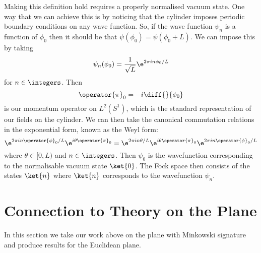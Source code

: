 \documentclass[fleqn]{NotesClass}
\begin{document}
    Making this definition hold requires a properly normalised vacuum state.
    One way that we can achieve this is by noticing that the cylinder imposes periodic boundary conditions on any wave function.
    So, if the wave function \(\psi_n\) is a function of \(\phi_0\) then it should be that \(\psi(\phi_0) = \psi(\phi_0 + L)\).
    We can impose this by taking
    \begin{equation}
        \psi_n(\phi_0) = \frac{1}{\sqrt{L}} \e^{2\pi i n\phi_0/L}
    \end{equation}
    for \(n \in \integers\).
    Then
    \begin{equation}
        \operator{\pi}_0 = -i\diff{}{\phi_0}
    \end{equation}
    is our momentum operator on \(L^2(S^1)\), which is the standard representation of our fields on the cylinder.
    We can then take the canonical commutation relations in the exponential form, known as the Weyl form:
    \begin{equation}
        \e^{2\pi in\operator{\phi}_0/L} \e^{i\theta \operator{\pi}_0} = \e^{2\pi in \theta/L} \e^{i\theta\operator{\pi}_0} \e^{2\pi in \operator{\phi}_0/L}
    \end{equation}
    where \(\theta \in [0, L)\) and \(n \in \integers\).
    Then \(\psi_0\) is the wavefunction corresponding to the normalisable vacuum state \(\ket{0}\).
    The Fock space then consists of the states \(\ket{n}\) where \(\ket{n}\) corresponds to the wavefunction \(\psi_n\).
    
    \section{Connection to Theory on the Plane}
    In this section we take our work above on the plane with Minkowski signature and produce results for the Euclidean plane.
    
    
    
    
    
    
    
    
    
\end{document}
